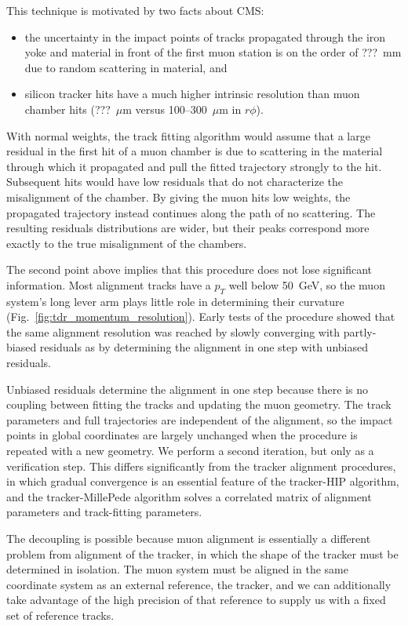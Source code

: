 \documentclass[12pt]{article}
\begin{document}
This technique is motivated by two facts about CMS:
\begin{itemize}
\item the uncertainty in the impact points of tracks propagated
  through the iron yoke and material in front of the first muon
  station is on the order of ???~mm due to random scattering in
  material, and
\item silicon tracker hits have a much higher intrinsic resolution
  than muon chamber hits (???~$\mu$m versus 100--300~$\mu$m in
  $r\phi$).
\end{itemize}

With normal weights, the track fitting algorithm would assume that a
large residual in the first hit of a muon chamber is due to scattering
in the material through which it propagated and pull the fitted
trajectory strongly to the hit.  Subsequent hits would have low
residuals that do not characterize the misalignment of the chamber.
By giving the muon hits low weights, the propagated trajectory instead
continues along the path of no scattering.  The resulting residuals
distributions are wider, but their peaks correspond more exactly to
the true misalignment of the chambers.

The second point above implies that this procedure does not lose
significant information.  Most alignment tracks have a $p_T$ well
below 50~GeV, so the muon system's long lever arm plays little role in
determining their curvature (Fig.~\ref{fig:tdr_momentum_resolution}).
Early tests of the procedure showed that the same alignment resolution
was reached by slowly converging with partly-biased residuals as by
determining the alignment in one step with unbiased residuals.

Unbiased residuals determine the alignment in one step because there
is no coupling between fitting the tracks and updating the muon
geometry.  The track parameters and full trajectories are independent
of the alignment, so the impact points in global coordinates are
largely unchanged when the procedure is repeated with a new geometry.
We perform a second iteration, but only as a verification step.  This
differs significantly from the tracker alignment procedures, in which
gradual convergence is an essential feature of the tracker-HIP
algorithm, and the tracker-MillePede algorithm solves a correlated
matrix of alignment parameters and track-fitting parameters.

The decoupling is possible because muon alignment is essentially a
different problem from alignment of the tracker, in which the shape of
the tracker must be determined in isolation.  The muon system must be
aligned in the same coordinate system as an external reference, the
tracker, and we can additionally take advantage of the high precision
of that reference to supply us with a fixed set of reference tracks.
\end{document}
